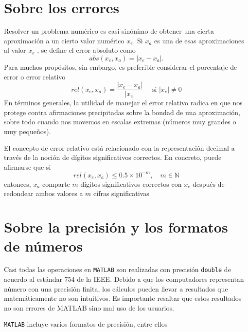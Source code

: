 \documentclass[11pt]{article}
\begin{document}


\section{Sobre los errores}

Resolver un problema num\'erico es casi sin\'onimo de obtener una cierta aproximaci\'on a
un cierto valor num\'erico $x_e$. Si $x_a$ es una de esas aproximaciones al valor $x_e$ , se define el
error absoluto como
$$
abs(x_e,x_a)=|x_e - x_a|.
$$
Para muchos prop\'ositos, sin embargo, es preferible considerar el porcentaje de error o
error relativo
$$
rel(x_e,x_a)=\frac{|x_e-x_a|}{|x_e|} \quad \text{ si } |x_e|\neq 0
$$
En t\'erminos generales, la utilidad de manejar el error relativo radica en que nos protege
contra afirmaciones precipitadas sobre la bondad de una aproximaci\'on, sobre todo cuando
nos movemos en escalas extremas (n\'umeros muy grandes o muy peque\~{n}os).

El concepto de error relativo est\'a relacionado con la representaci\'on decimal a trav\'es de
la noci\'on de d\'igitos significativos correctos. En concreto, puede afirmarse que si
$$
rel(x_e,x_a) \leq  0.5 \times 10^{-m}, \quad m \in \mathbb{N}
$$
entonces, $x_a$ comparte $m$ d\'igitos significativos correctos con $x_e$ despu\'es de redondear ambos
valores a $m$ cifras significativas

\section{ \textbf{Sobre la precisi\'on y los formatos de n\'umeros}}

Casi todas las operaciones en \texttt{MATLAB} son realizadas con precisi\'on \texttt{double} de acuerdo al est\'andar 754 de la IEEE. Debido a que los computadores representan n\'umero con una precisi\'on finita, los c\'alculos pueden llevar a resultados que matem\'aticamente no son intuitivos. Es importante resaltar que estos resultados no son errores de MATLAB sino mal uso de los usuarios.

\texttt{MATLAB} incluye varios formatos de precisi\'on, entre ellos 
\end{document}
